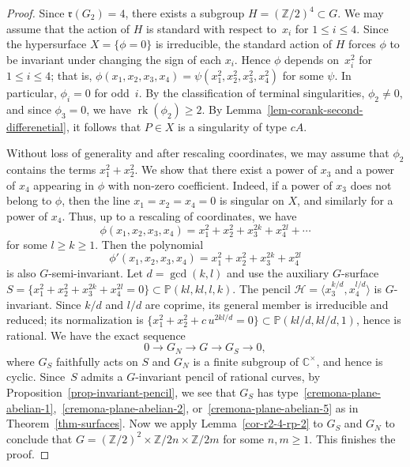 \documentclass[11pt]{amsart}
\numberwithin{equation}{section}
\theoremstyle{definition}
\theoremstyle{remark}
\newcommand{\lra}{\longrightarrow}
\DeclareMathOperator{\rk}{rk}
\begin{document}
\begin{proof}
Since $\mathfrak{r}(G_2)=4$, there exists a subgroup $H=(\mathbb{Z}/2)^4\subset G$.  We may assume that the action of $H$ is standard with respect to~$x_i$ for $1\leq i\leq 4$.  Since the hypersurface $X=\{\phi=0\}$ is irreducible, the standard action of $H$ forces $\phi$ to be invariant under changing the sign of each $x_i$. Hence $\phi$ depends on~$x_i^2$ for $1\leq i\leq 4$; that is, $\phi(x_1,x_2,x_3,x_4)=\psi(x_1^2,x_2^2,x_3^2,x_4^2)$ for some $\psi$.  In particular, $\phi_i=0$ for odd~$i$.  By the classification of terminal singularities, $\phi_2\neq 0$, and since $\phi_3 = 0$, we have $\rk(\phi_2) \geq 2$.  By Lemma~\ref{lem-corank-second-differenetial}, it follows that $P\in X$ is a singularity of type $cA$.

Without loss of generality and after rescaling coordinates, we may assume that $\phi_2$ contains the terms $x_1^2+x_2^2$. We show that there exist a power of $x_3$ and a power of $x_4$ appearing in $\phi$ with non-zero coefficient. Indeed, if a power of $x_3$ does not belong to $\phi$, then the line $x_1=x_2=x_4=0$ is singular on $X$, and similarly for a power of $x_4$. Thus, up to a rescaling of coordinates, we have
\begin{equation}
\label{eq-gorenstein-rk-2}
\phi(x_1,x_2,x_3,x_4) = x_1^2+x_2^2+x_3^{2k}+x_4^{2l}+\cdots
\end{equation}
for some $l\geq k\geq 1$. Then the polynomial 
\[
\phi'(x_1,x_2,x_3,x_4) = x_1^2+x_2^2+x_3^{2k}+x_4^{2l} 
\]
is also $G$-semi-invariant. 
Let $d=\gcd(k,l)$ and use the auxiliary $G$-surface
$S=\{x_1^2+x_2^2+x_3^{2k}+x_4^{2l}=0\}\subset\mathbb{P}(kl,kl,l,k)$.
The pencil $\mathcal H=\langle x_3^{k/d},x_4^{l/d}\rangle$ is $G$-invariant. Since $k/d$ and $l/d$ are coprime, its general member is irreducible and reduced; its normalization is
$\{x_1^2+x_2^2+c\,u^{2kl/d}=0\}\subset\mathbb{P}(kl/d,kl/d,1)$, hence is rational.
We have the  exact sequence
\begin{equation}
\label{eq-exact-sequence-blow-up-of-point}
0 \lra G_N \lra G \lra G_S \lra 0, 
\end{equation}
where $G_S$ faithfully acts on $S$ and $G_N$ is a finite subgroup of $\mathbb{C}^\times$, and hence is cyclic.
Since~$S$ admits a $G$-invariant pencil of rational curves, by Proposition~\ref{prop-invariant-pencil}, we see that $G_S$ has type~\eqref{cremona-plane-abelian-1},~\eqref{cremona-plane-abelian-2}, or~\eqref{cremona-plane-abelian-5} as in Theorem~\ref{thm-surfaces}.
Now we apply Lemma~\ref{cor-r2-4-rp-2} to $G_S$ and $G_N$ to conclude that $G=(\mathbb{Z}/2)^2\times\mathbb{Z}/2n\times\mathbb{Z}/2m$ for some $n,m\geq 1$. 
This finishes the proof.
\end{proof}
\end{document}
